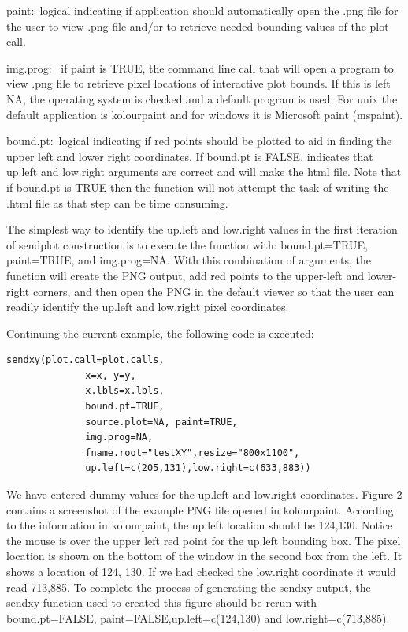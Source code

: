 \documentclass[]{article}
\begin{document}
\begin{description}
 \item{paint:~}{logical indicating if application should
    automatically open the .png file for the user to view .png file and/or
    to retrieve needed bounding values of the plot call.}

  \item{img.prog:~ }{if paint is TRUE, the command line call that will open
    a program to view .png file to retrieve pixel locations of interactive
    plot bounds. If this is left NA, the operating system is checked and
    a default program is used. For unix the default application is
    kolourpaint and for windows it is Microsoft paint (mspaint).}

  \item{bound.pt:~}{logical indicating if red points should be plotted to
    aid in finding the upper left and lower right coordinates. If
    bound.pt is FALSE, indicates that up.left and low.right arguments
    are correct and will make the html file. Note that if bound.pt is TRUE then the function will not
    attempt the task of writing the .html file as that step can be time consuming.}

 \end{description}
The simplest way to identify the up.left and low.right values in the first iteration of sendplot construction is to execute the function with: bound.pt=TRUE, paint=TRUE, and img.prog=NA. With this combination of arguments, the function will create the PNG output, add red points to the upper-left and lower-right corners, and then open the PNG in the default viewer so that the user can readily identify the up.left and low.right pixel coordinates. 

\indent Continuing the current example, the following code is executed:
\begin{verbatim}
sendxy(plot.call=plot.calls, 
              x=x, y=y,
              x.lbls=x.lbls, 
              bound.pt=TRUE, 
              source.plot=NA, paint=TRUE,
              img.prog=NA,
              fname.root="testXY",resize="800x1100",
              up.left=c(205,131),low.right=c(633,883))
\end{verbatim}
We have entered dummy values for the up.left and low.right coordinates. Figure 2 contains a screenshot of the example PNG file opened in kolourpaint. According to the information in kolourpaint, the up.left location should be 124,130. Notice the mouse is over the upper left red point for the up.left bounding box. The pixel location is shown on the bottom of the window in the second box from the left. It shows a location of 124, 130. If we had checked the low.right coordinate it would read 713,885. To complete the process of generating the sendxy output, the sendxy function used to created this figure should be rerun with bound.pt=FALSE, paint=FALSE,up.left=c(124,130) and low.right=c(713,885). \newline
\end{document}
